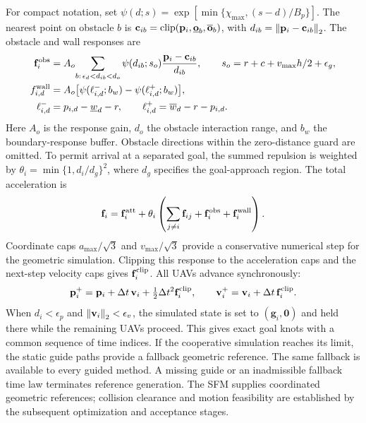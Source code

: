For compact notation, set $\psi(d;s)=\exp[\min\{\chi_{\max},(s-d)/B_p\}]$. The nearest point on obstacle $b$ is $\mathbf c_{ib}=\operatorname{clip}(\mathbf{p}_i,\underline{\mathbf o}_b,\overline{\mathbf o}_b)$, with $d_{ib}=\left\lVert \mathbf{p}_i-\mathbf c_{ib}\right\rVert_2$. The obstacle and wall responses are
\begin{subequations}\label{eq:obstacle-forces}\begin{align}
 \mathbf f_i^{\rm obs}
 &=A_o\!\sum_{b:\,\epsilon_d<d_{ib}<d_o}
 \psi(d_{ib};s_o)\frac{\mathbf{p}_i-\mathbf c_{ib}}{d_{ib}},
 \qquad s_o=r+c+v_{\max}h/2+\epsilon_g,\\
 f_{i,d}^{\rm wall}
 &=A_o\big[\psi(\ell_{i,d}^{-};b_w)-\psi(\ell_{i,d}^{+};b_w)\big],\\
 \ell_{i,d}^{-}&=p_{i,d}-\underline w_d-r,\qquad
 \ell_{i,d}^{+}=\overline w_d-r-p_{i,d}.
\end{align}\end{subequations}
Here $A_o$ is the response gain, $d_o$ the obstacle interaction range, and $b_w$ the boundary-response buffer. Obstacle directions within the zero-distance guard are omitted. To permit arrival at a separated goal, the summed repulsion is weighted by $\theta_i=\min\{1,d_i/d_g\}^2$, where $d_g$ specifies the goal-approach region. The total acceleration is
\[
 \mathbf f_i=\mathbf f_i^{\rm att}
 +\theta_i\left(\sum_{j\ne i}\mathbf f_{ij}
 +\mathbf f_i^{\rm obs}+\mathbf f_i^{\rm wall}\right).
\]
Coordinate caps $a_{\max}/\sqrt3$ and $v_{\max}/\sqrt3$ provide a conservative numerical step for the geometric simulation. Clipping this response to the acceleration caps and the next-step velocity caps gives $\mathbf f_i^{\rm clip}$. All UAVs advance synchronously:
\begin{equation}
 \mathbf{p}_i^+=\mathbf{p}_i+\Delta t\,\mathbf{v}_i+\tfrac12\Delta t^2\mathbf f_i^{\rm clip},
 \qquad \mathbf{v}_i^+=\mathbf{v}_i+\Delta t\,\mathbf f_i^{\rm clip}.
 \label{eq:simulation}
\end{equation}
When $d_i<\epsilon_p$ and $\left\lVert \mathbf{v}_i\right\rVert_2<\epsilon_v$, the simulated state is set to $(\mathbf g_i,\mathbf0)$ and held there while the remaining UAVs proceed. This gives exact goal knots with a common sequence of time indices. If the cooperative simulation reaches its limit, the static guide paths provide a fallback geometric reference. The same fallback is available to every guided method. A missing guide or an inadmissible fallback time law terminates reference generation. The SFM supplies coordinated geometric references; collision clearance and motion feasibility are established by the subsequent optimization and acceptance stages.

